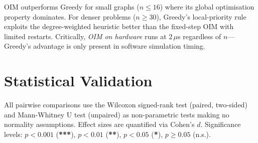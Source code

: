 OIM outperforms Greedy for small graphs ($n \leq 16$) where its global
optimisation property dominates.  For denser problems ($n \geq 30$), Greedy's
local-priority rule exploits the degree-weighted heuristic better than the
fixed-step OIM with limited restarts.  Critically, \emph{OIM on hardware} runs
at $2\,\mu$s regardless of $n$—Greedy's advantage is only present in software
simulation timing.

\section{Statistical Validation}
\label{sec:statistical}

All pairwise comparisons use the Wilcoxon signed-rank test (paired, two-sided)
and Mann-Whitney U test (unpaired) as non-parametric tests making no normality
assumptions.  Effect sizes are quantified via Cohen's $d$.  Significance levels:
$p < 0.001$ (\textbf{***}), $p < 0.01$ (\textbf{**}), $p < 0.05$ (\textbf{*}),
$p \geq 0.05$ (n.s.).

